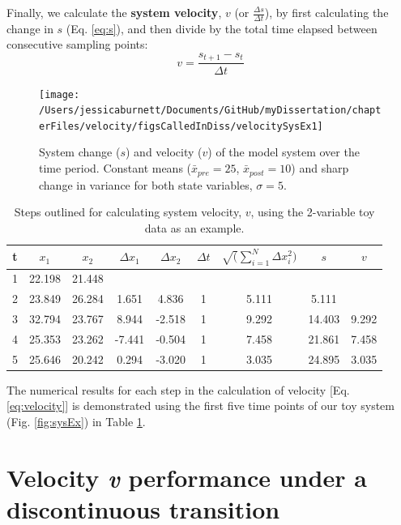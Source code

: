 \documentclass[12pt,twoside,openany]{reedthesis}
\begin{document}
Finally, we calculate the \textbf{system velocity}, \(v\) (or \(\frac{\Delta s}{\Delta t}\)), by first calculating the change in \(s\) (Eq. \eqref{eq:s}), and then divide by the total time elapsed between consecutive sampling points:
\begin{equation}
 v = \frac {s_{t+1}-s_{t}}{\Delta t} 
\label{eq:velocity}
\end{equation}
\begin{figure}
\texttt{[image: /Users/jessicaburnett/Documents/GitHub/myDissertation/chapterFiles/velocity/figsCalledInDiss/velocitySysEx1]} \caption{System change ($s$) and velocity ($v$) of the model system over the time period. Constant means ($\bar{x}_{pre}=25$, $\bar{x}_{post}=10$) and sharp change in variance for both state variables, $\sigma =5$.}\label{fig:velocSysEx1}
\end{figure}
\begin{table}[t]

\caption{\label{tab:distTab}Steps outlined for calculating system velocity, $v$, using the 2-variable toy data as an example.}
\centering
\begin{tabular}{ccccccccc}
\toprule
t & $x_1$ & $x_2$ & $\Delta x_1$ & $\Delta x_2$ & $\Delta t$ & $\sqrt(\sum_{i=1}^N \Delta x_i^2) $ & $s$ & $v$\\
\midrule
1 & 22.198 & 21.448 &  &  &  &  &  & \\
2 & 23.849 & 26.284 & 1.651 & 4.836 & 1 & 5.111 & 5.111 & \\
3 & 32.794 & 23.767 & 8.944 & -2.518 & 1 & 9.292 & 14.403 & 9.292\\
4 & 25.353 & 23.262 & -7.441 & -0.504 & 1 & 7.458 & 21.861 & 7.458\\
5 & 25.646 & 20.242 & 0.294 & -3.020 & 1 & 3.035 & 24.895 & 3.035\\
\bottomrule
\end{tabular}
\end{table}
The numerical results for each step in the calculation of velocity {[}Eq. \eqref{eq:velocity}{]} is demonstrated using the first five time points of our toy system (Fig. \ref{fig:sysEx}) in Table \ref{tab:distTab}.

\hypertarget{velocity-v-performance-under-a-discontinuous-transition}{%
\section{\texorpdfstring{Velocity \emph{v} performance under a discontinuous transition}{Velocity v performance under a discontinuous transition}}\label{velocity-v-performance-under-a-discontinuous-transition}}
\end{document}
